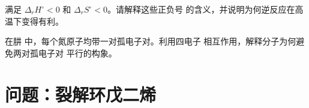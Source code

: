 \begin{exercise}[$\star\star\star$]\label{exo:b2:frontier-orbitals:11}
满足 $\Delta_r H^\circ < 0$ 和 $\Delta_r S^\circ < 0$。请解释这些正负号
的含义，并说明为何逆反应在高温下变得有利。
\end{exercise}

\begin{exercise}[$\star\star\star$]\label{exo:b2:frontier-orbitals:12}
在肼  中，每个氮原子均带一对孤电子对。利用四电子
相互作用，解释分子为何避免两对孤电子对
平行的构象。
\end{exercise}

\section{问题：裂解环戊二烯}

